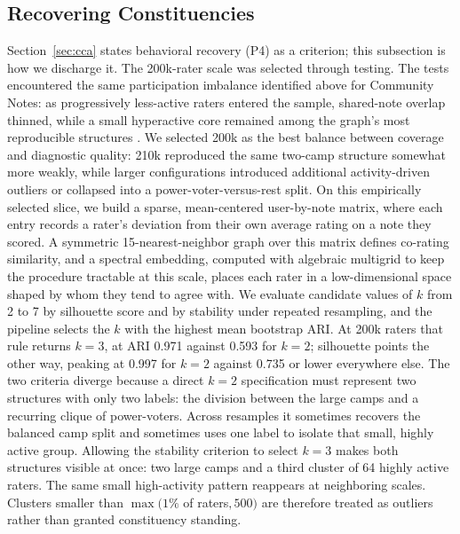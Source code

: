 \documentclass[10pt,twocolumn]{article}
\begin{document}
\subsection{Recovering Constituencies}

Section~\ref{sec:cca} states behavioral recovery (P4) as a criterion; this
subsection is how we discharge it. The 200k-rater scale was selected through
testing. The tests encountered
the same participation imbalance identified above for Community Notes: as
progressively less-active raters entered the sample, shared-note overlap
thinned, while a small hyperactive core remained among the graph's most
reproducible structures \citep{nudo2026hyperactive,razuvayevskaya2025timeliness}.
We selected 200k as the best balance between coverage and diagnostic quality:
210k reproduced the same two-camp structure somewhat more weakly, while larger
configurations introduced additional activity-driven outliers or collapsed
into a power-voter-versus-rest split. On this empirically selected slice, we
build a sparse, mean-centered user-by-note matrix, where each entry records a
rater's deviation from their own average rating on a note they scored. A
symmetric 15-nearest-neighbor graph over this matrix defines co-rating
similarity, and a spectral embedding, computed with algebraic multigrid to keep
the procedure tractable at this scale, places each rater in a low-dimensional
space shaped by whom they tend to agree with. We evaluate
candidate values of $k$ from 2 to 7 by silhouette score and by stability under
repeated resampling, and the pipeline selects the $k$ with the highest mean
bootstrap ARI. At 200k raters that rule returns $k=3$, at ARI 0.971 against
0.593 for $k=2$; silhouette points the other way, peaking at 0.997 for $k=2$
against 0.735 or lower everywhere else. The two criteria diverge because a
direct $k=2$ specification must represent two structures with only two labels:
the division between the large camps and a recurring clique of power-voters.
Across resamples it sometimes recovers the balanced camp split and sometimes
uses one label to isolate that small, highly active group. Allowing the
stability criterion to select $k=3$ makes both structures visible at once: two
large camps and a third cluster of 64 highly active raters. The same small
high-activity pattern reappears at neighboring scales. Clusters smaller than
$\max(1\%$ of raters$, 500)$ are therefore treated as outliers rather than
granted constituency standing.
\end{document}
